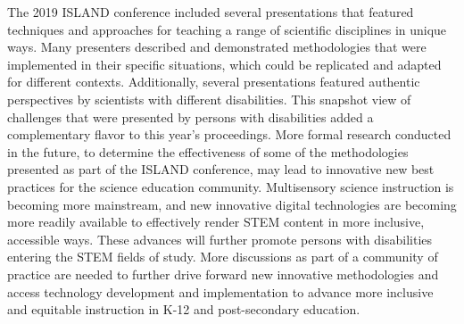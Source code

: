 \documentclass[11.5pt]{sig-alternate} %
\begin{document}
\begin{large}
The 2019 ISLAND conference included several presentations that featured techniques and approaches for teaching a range of scientific disciplines in unique ways. Many presenters described and demonstrated methodologies that were implemented in their specific situations, which could be replicated and adapted for different contexts.  Additionally, several presentations featured authentic perspectives by scientists with different disabilities.  This snapshot view of challenges that were presented by persons with disabilities added a complementary flavor to this year’s proceedings. More formal research conducted in the future, to determine the effectiveness of some of the methodologies presented as part of the ISLAND conference, may lead to innovative new best practices for the science education community. Multisensory science instruction is becoming more mainstream, and new innovative digital technologies are becoming more readily available to effectively render STEM content in more inclusive, accessible ways. These advances will further promote persons with disabilities entering the STEM fields of study. More discussions as part of a community of practice are needed to further drive forward new innovative methodologies and access technology development and implementation to advance more inclusive and equitable instruction in K-12 and post-secondary education.

\end{large}
\end{document}
